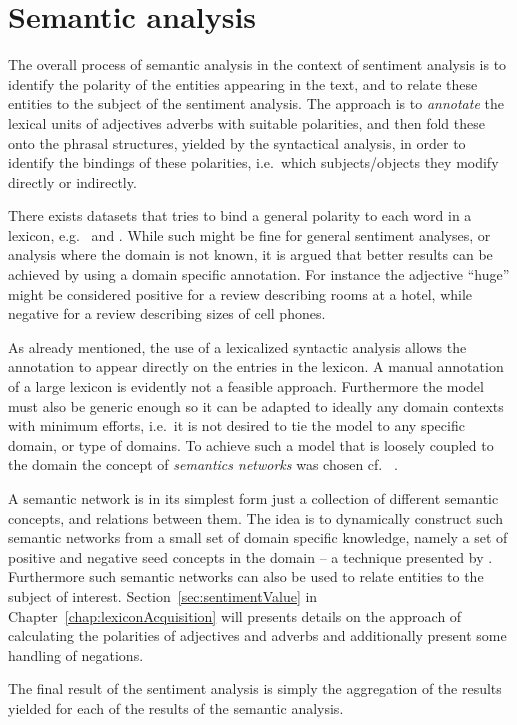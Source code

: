 \section{Semantic analysis}
\label{sec:semanticAnalysis}
The overall process of semantic analysis in the context of sentiment analysis is to identify the polarity of the entities appearing in the text, and to relate these entities to the subject of the sentiment analysis. The approach is to \emph{annotate} the lexical units of adjectives adverbs with suitable polarities, and then fold these onto the phrasal structures, yielded by the syntactical analysis, in order to identify the bindings of these polarities, i.e.\ which subjects/objects they modify directly or indirectly.

There exists datasets that tries to bind a general polarity to each word in a lexicon, e.g.\ \cite{sentiWordNet} and \cite{sentiWordNet3}. While such might be fine for general sentiment analyses, or analysis where the domain is not known, it is argued that better results can be achieved by using a domain specific annotation. For instance the adjective ``huge'' might be considered positive for a review describing rooms at a hotel, while negative for a review describing sizes of cell phones.

As already mentioned, the use of a lexicalized syntactic analysis allows the annotation to appear directly on the entries in the lexicon. A manual annotation of a large lexicon is evidently not a feasible approach. Furthermore the model must also be generic enough so it can be adapted to ideally any domain contexts with minimum efforts, i.e.\ it is not desired to tie the model to any specific domain, or type of domains. To achieve such a model that is loosely coupled to the domain the concept of \emph{semantics networks} was chosen cf.\ \citeauthor{ai} .

A semantic network is in its simplest form just a collection of different semantic concepts, and relations between them. The idea is to dynamically construct such semantic networks from a small set of domain specific knowledge, namely a set of positive and negative seed concepts in the domain -- a technique presented by \citeauthor{valenceShifting} . Furthermore such semantic networks can also be used to relate entities to the subject of interest. Section~\ref{sec:sentimentValue} in Chapter~\ref{chap:lexiconAcquisition} will presents details on the approach of calculating the polarities of adjectives and adverbs and additionally present some handling of negations.

The final result of the sentiment analysis is simply the aggregation of the results yielded for each of the results of the semantic analysis.